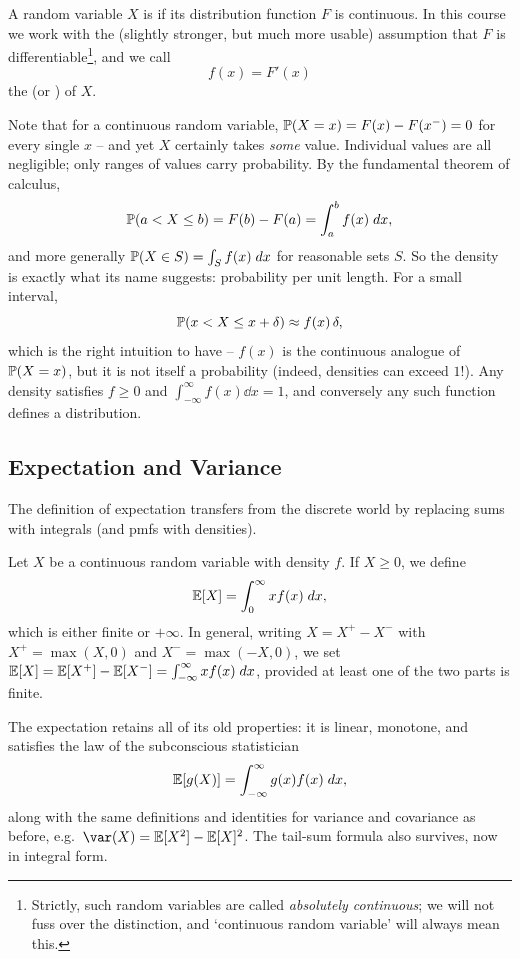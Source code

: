 \documentclass[a4paper]{scrartcl}
\begin{document}
\begin{definition}
	A random variable $X$ is  if its distribution function $F$ is continuous. In this course we work with the (slightly stronger, but much more usable) assumption that $F$ is differentiable\footnote{Strictly, such random variables are called \emph{absolutely continuous}; we will not fuss over the distinction, and `continuous random variable' will always mean this.}, and we call
	$$
	f(x) = F'(x)
	$$
	the  (or ) of $X$.
\end{definition}

Note that for a continuous random variable, $\mathbb{P}(X = x) = F(x) - F(x^-) = 0$ for every single $x$ -- and yet $X$ certainly takes \emph{some} value. Individual values are all negligible; only ranges of values carry probability. By the fundamental theorem of calculus,
$$
\mathbb{P}(a < X \leq b) = F(b) - F(a) = \int_a^b f(x) \; d x,
$$
and more generally $\mathbb{P}(X \in S) = \int_S f(x)\; d x$ for reasonable sets $S$. So the density is exactly what its name suggests: probability per unit length. For a small interval,
$$
\mathbb{P}(x < X \leq x + \delta) \approx f(x)\,\delta,
$$
which is the right intuition to have -- $f(x)$ is the continuous analogue of $\mathbb{P}(X = x)$, but it is not itself a probability (indeed, densities can exceed $1$!). Any density satisfies $f \geq 0$ and $\int_{-\infty}^{\infty} f(x)\dd x = 1$, and conversely any such function defines a distribution.

\subsection{Expectation and Variance}

The definition of expectation transfers from the discrete world by replacing sums with integrals (and pmfs with densities).

\begin{definition}[Expectation]
	Let $X$ be a continuous random variable with density $f$. If $X \geq 0$, we define
	$$
	\mathbb{E}[X] = \int_0^{\infty} x f(x) \; d x,
	$$
	which is either finite or $+\infty$. In general, writing $X = X^+ - X^-$ with $X^+ = \max(X, 0)$ and $X^- = \max(-X, 0)$, we set $\mathbb{E}[X] = \mathbb{E}[X^+] - \mathbb{E}[X^-] = \int_{-\infty}^{\infty} xf(x)\; d x$, provided at least one of the two parts is finite.
	\end{definition}

The expectation retains all of its old properties: it is linear, monotone, and satisfies the law of the subconscious statistician
$$
\mathbb{E}[g(X)] = \int_{-\infty}^{\infty} g(x)f(x)\; d x,
$$
along with the same definitions and identities for variance and covariance as before, e.g.\ $\var(X) = \EE[X^2] - \EE[X]^2$. The tail-sum formula also survives, now in integral form.
\end{document}
